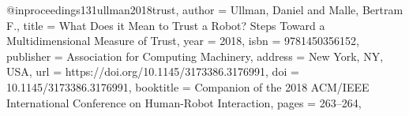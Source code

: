 @inproceedings{131ullman2018trust,
author = {Ullman, Daniel and Malle, Bertram F.},
title = {What Does it Mean to Trust a Robot? Steps Toward a Multidimensional Measure of Trust},
year = {2018},
isbn = {9781450356152},
publisher = {Association for Computing Machinery},
address = {New York, NY, USA},
url = {https://doi.org/10.1145/3173386.3176991},
doi = {10.1145/3173386.3176991},
booktitle = {Companion of the 2018 ACM/IEEE International Conference on Human-Robot Interaction},
pages = {263–264},
}